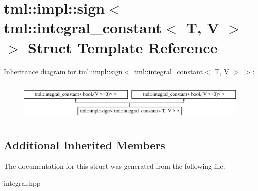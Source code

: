 \hypertarget{structtml_1_1impl_1_1sign_3_01tml_1_1integral__constant_3_01T_00_01V_01_4_01_4}{\section{tml\+:\+:impl\+:\+:sign$<$ tml\+:\+:integral\+\_\+constant$<$ T, V $>$ $>$ Struct Template Reference}
\label{structtml_1_1impl_1_1sign_3_01tml_1_1integral__constant_3_01T_00_01V_01_4_01_4}
}
Inheritance diagram for tml\+:\+:impl\+:\+:sign$<$ tml\+:\+:integral\+\_\+constant$<$ T, V $>$ $>$\+:\begin{figure}[H]
\begin{center}
\leavevmode
\includegraphics[height=1.985816cm]{structtml_1_1impl_1_1sign_3_01tml_1_1integral__constant_3_01T_00_01V_01_4_01_4}
\end{center}
\end{figure}
\subsection*{Additional Inherited Members}


The documentation for this struct was generated from the following file\+:\begin{DoxyCompactItemize}
\item 
integral.\+hpp\end{DoxyCompactItemize}
